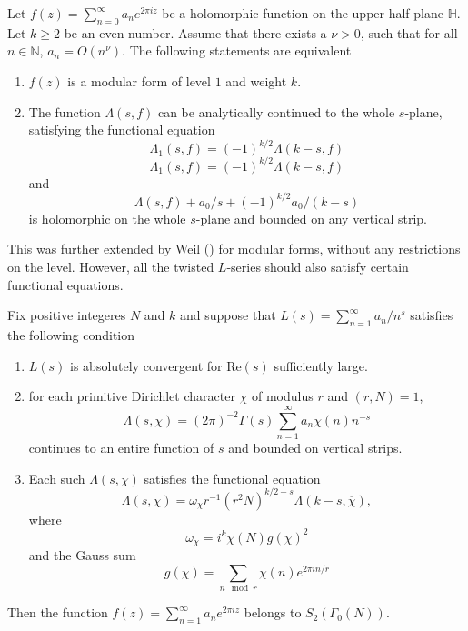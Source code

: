 \documentclass{book}
\begin{document}
\begin{theorem} [Hecke]
Let $f(z)=\sum_{n=0}^{\infty}a_n e^{2 \pi i z}$ be a holomorphic function on the upper half plane $\mathbb{H}$. Let $k \geq 2$ be an even number. Assume that there exists a $\nu >0$, such that for all $n \in \mathbb{N}$,  $a_n =O(n^{\nu})$. The following statements are equivalent
\begin{enumerate}
\item $f(z)$ is a modular form of level $1$ and weight $k$.
\item The function $\Lambda(s,f)$ can be analytically continued to the whole $s$-plane, satisfying the functional equation
\begin{equation}
\Lambda_1(s,f)=(-1)^{k/2}\Lambda(k-s,f)
\end{equation}
\begin{equation}
\Lambda_1(s,f)=(-1)^{k/2}\Lambda(k-s,f)
\end{equation}
and
\begin{equation}
\Lambda(s,f) + a_0/s  + (-1)^{k/2}a_0/(k-s)
\end{equation}
is holomorphic on the whole $s$-plane and bounded on any vertical strip.
\end{enumerate}
\end{theorem}

This was further extended by Weil (\cite{weil1967bestimmung}) for modular forms, without any restrictions on the level. However, all the twisted $L$-series should also satisfy certain functional equations.

\begin{theorem} [Weil]
Fix positive integeres $N$ and $k$ and suppose that $L(s) = \sum_{n=1}^{\infty}a_n/n^s$ satisfies the following condition
\begin{enumerate}
\item $L(s)$ is absolutely convergent for $\text{Re}(s)$ sufficiently large.
\item for each primitive Dirichlet character $\chi$ of modulus $r$ and $(r,N)=1$,
\begin{equation}
\Lambda(s,\chi) = (2 \pi)^{-2} \Gamma(s)  \sum_{n=1}^{\infty} a_n \chi(n) n^{-s}
\end{equation}
continues to an entire function of $s$ and bounded on vertical strips.
\item Each such $\Lambda(s,\chi)$ satisfies the functional equation
\begin{equation}
\Lambda(s,\chi)= \omega_\chi r^{-1} (r^2 N)^{k/2-s} \Lambda(k-s,\overline{\chi}),
\end{equation}
where
\begin{equation}
\omega_\chi = i^k \chi(N) g(\chi)^2
\end{equation}
and the Gauss sum
\begin{equation}
g(\chi)=\sum_{n \mod r} \chi(n) e^{2 \pi i n /r}
\end{equation}
\end{enumerate}
Then the function $f(z) = \sum_{n=1}^{\infty} a_n e^{2 \pi i z }$ belongs to $S_2(\Gamma_0(N))$.
\end{theorem}
\end{document}
